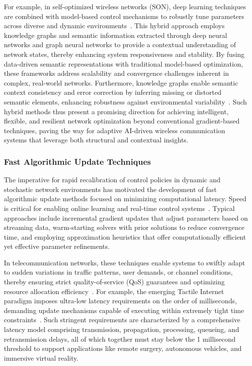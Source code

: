 \documentclass[sigconf]{acmart}
\begin{document}
For example, in self-optimized wireless networks (SON), deep learning techniques are combined with model-based control mechanisms to robustly tune parameters across diverse and dynamic environments~\cite{ref1}. This hybrid approach employs knowledge graphs and semantic information extracted through deep neural networks and graph neural networks to provide a contextual understanding of network states, thereby enhancing system responsiveness and stability. By fusing data-driven semantic representations with traditional model-based optimization, these frameworks address scalability and convergence challenges inherent in complex, real-world networks. Furthermore, knowledge graphs enable semantic context consistency and error correction by inferring missing or distorted semantic elements, enhancing robustness against environmental variability~\cite{ref1}. Such hybrid methods thus present a promising direction for achieving intelligent, flexible, and resilient network optimization beyond conventional gradient-based techniques, paving the way for adaptive AI-driven wireless communication systems that leverage both structural and contextual insights.

\subsubsection{Fast Algorithmic Update Techniques}

The imperative for rapid recalibration of control policies in dynamic and stochastic network environments has motivated the development of fast algorithmic update methods focused on minimizing computational latency. Speed is critical for enabling online learning and real-time control systems~\cite{ref2,ref3,ref6,ref8,ref9,ref11,ref15,ref16}. Typical approaches include incremental gradient updates that adjust parameters based on streaming data, warm-starting solvers with prior solutions to reduce convergence time, and employing approximation heuristics that offer computationally efficient yet effective parameter refinements.

In telecommunication networks, these techniques enable systems to swiftly adapt to sudden variations in traffic patterns, user demands, or channel conditions, thereby ensuring strict quality-of-service (QoS) guarantees and optimizing resource allocation efficiency~\cite{ref10}. For example, the emerging Tactile Internet paradigm imposes ultra-low latency requirements on the order of milliseconds, demanding update mechanisms capable of executing within extremely tight time constraints~\cite{ref10}. Such stringent requirements are characterized by a comprehensive latency model comprising transmission, propagation, processing, queueing, and retransmission delays, all of which together must stay below the 1 millisecond threshold to support applications like remote surgery, autonomous vehicles, and immersive virtual reality.
\end{document}
